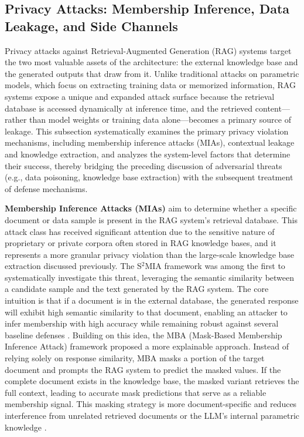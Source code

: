 \documentclass[11pt]{article}
\begin{document}
\subsection{Privacy Attacks: Membership Inference, Data Leakage, and Side Channels}

Privacy attacks against Retrieval-Augmented Generation (RAG) systems target the two most valuable assets of the architecture: the external knowledge base and the generated outputs that draw from it. Unlike traditional attacks on parametric models, which focus on extracting training data or memorized information, RAG systems expose a unique and expanded attack surface because the retrieval database is accessed dynamically at inference time, and the retrieved content---rather than model weights or training data alone---becomes a primary source of leakage. This subsection systematically examines the primary privacy violation mechanisms, including membership inference attacks (MIAs), contextual leakage and knowledge extraction, and analyzes the system-level factors that determine their success, thereby bridging the preceding discussion of adversarial threats (e.g., data poisoning, knowledge base extraction) with the subsequent treatment of defense mechanisms.

\textbf{Membership Inference Attacks (MIAs)} aim to determine whether a specific document or data sample is present in the RAG system's retrieval database. This attack class has received significant attention due to the sensitive nature of proprietary or private corpora often stored in RAG knowledge bases, and it represents a more granular privacy violation than the large-scale knowledge base extraction discussed previously. The S\(^2\)MIA framework was among the first to systematically investigate this threat, leveraging the semantic similarity between a candidate sample and the text generated by the RAG system. The core intuition is that if a document is in the external database, the generated response will exhibit high semantic similarity to that document, enabling an attacker to infer membership with high accuracy while remaining robust against several baseline defenses \cite{ref71}. Building on this idea, the MBA (Mask-Based Membership Inference Attack) framework proposed a more explainable approach. Instead of relying solely on response similarity, MBA masks a portion of the target document and prompts the RAG system to predict the masked values. If the complete document exists in the knowledge base, the masked variant retrieves the full context, leading to accurate mask predictions that serve as a reliable membership signal. This masking strategy is more document-specific and reduces interference from unrelated retrieved documents or the LLM's internal parametric knowledge \cite{ref474}.
\end{document}
